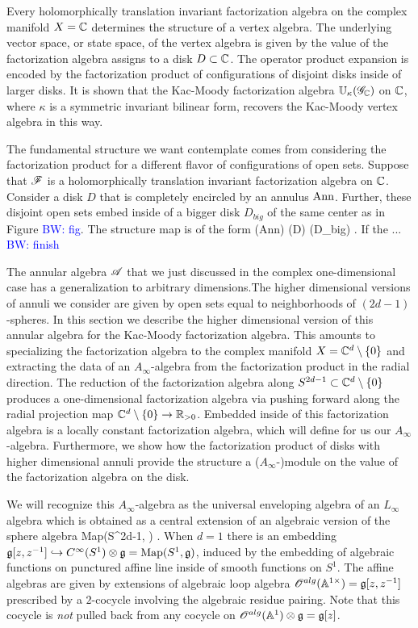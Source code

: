 \documentclass[10pt]{amsart}
\def\brian{\textcolor{blue}{BW: }\textcolor{blue}}
\begin{document}
Every holomorphically translation invariant factorization algebra on the complex manifold $X = \mathbb C$ determines the structure of a vertex algebra.
The underlying vector space, or state space, of the vertex algebra is given by the value of the factorization algebra assigns to a disk $D \subset \mathbb C$. 
The operator product expansion is encoded by the factorization product of configurations of disjoint disks inside of larger disks. 
It is shown that the Kac-Moody factorization algebra $\mathbb U_{\kappa}(\mathscr G_\mathbb C)$ on $\mathbb C$, where $\kappa$ is a symmetric invariant bilinear form, recovers the Kac-Moody vertex algebra in this way. 

The fundamental structure we want contemplate comes from considering the factorization product for a different flavor of configurations of open sets. 
Suppose that $\mathscr F$ is a holomorphically translation invariant factorization algebra on $\mathbb C$.
Consider a disk $D$ that is completely encircled by an annulus ${\rm Ann}$.
Further, these disjoint open sets embed inside of a bigger disk $D_{big}$ of the same center as in Figure \brian{fig}.
The structure map is of the form
\ben
\sF({\rm Ann}) \tensor \sF(D) \to \sF(D_{big}) .
\een
If the ... \brian{finish}

The annular algebra $\mathscr A$ that we just discussed in the complex one-dimensional case has a generalization to arbitrary dimensions.The higher dimensional versions of annuli we consider are given by open sets equal to neighborhoods of $(2d-1)$-spheres.
In this section we describe the higher dimensional version of this annular algebra for the Kac-Moody factorization algebra.
This amounts to specializing the factorization algebra to the complex manifold $X = \mathbb C^d \setminus \{0\}$ and extracting the data of an $A_\infty$-algebra from the factorization product in the radial direction.
The reduction of the factorization algebra along $S^{2d-1} \subset \mathbb C^d \setminus \{0\}$ produces a one-dimensional factorization algebra via pushing forward along the radial projection map $\mathbb C^d \setminus \{0\} \to \mathbb R_{>0}$.
Embedded inside of this factorization algebra is a locally constant factorization algebra, which will define for us our $A_\infty$-algebra.
Furthermore, we show how the factorization product of disks with higher dimensional annuli provide the structure a ($A_\infty$-)module on the value of the factorization algebra on the disk.

We will recognize this $A_\infty$-algebra as the universal enveloping algebra of an $L_\infty$ algebra which is obtained as a central extension of an algebraic version of the sphere algebra
\be\label{mapping space}
{\rm Map}(S^{2d-1}, \fg) .
\ee
When $d=1$ there is an embedding $\mathfrak g[z,z^{-1}] \hookrightarrow C^\infty(S^1) \otimes \mathfrak g = {\rm Map}(S^1, \mathfrak g)$, induced by the embedding of algebraic functions on punctured affine line inside of smooth functions on $S^1$. 
The affine algebras are given by extensions of algebraic loop algebra $\mathscr O^{alg}(\mathbb A^{1\times}) = \mathfrak g[z,z^{-1}]$ prescribed by a $2$-cocycle involving the algebraic residue pairing. 
Note that this cocycle is {\em not} pulled back from any cocycle on $\mathscr O^{alg}(\mathbb A^1) \otimes \mathfrak g = \mathfrak g[z]$. 
\end{document}
